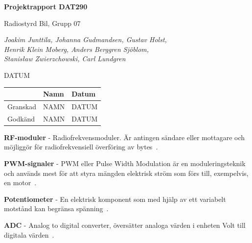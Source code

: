 \documentclass[a4paper]{article}
\begin{document}
\begin{titlepage}
\centering
{\bfseries\huge Projektrapport DAT290}

\vspace{10mm}

{\Large Radiostyrd Bil, Grupp 07}

\vspace{20mm}

{\Large \itshape{Joakim Junttila, Johanna Gudmandsen, Gustav Holst,\\Henrik Klein Moberg, Anders Berggren Sjöblom, \\[1mm] Stanisław Zwierzchowski, Carl Lundgren}}

\vspace{10mm}

{DATUM}


\normalsize{
\begin{table}[b]
\centering
\begin{tabular}{|l|l|l|}  \hline
         & \bf Namn & \bf Datum   \\ \hline \hline
Granskad & NAMN     & DATUM        \\ \hline
Godkänd  & NAMN     & DATUM         \\ \hline
\end{tabular} 
\end{table}}
\end{titlepage}

\tableofcontents

\newpage
{}

\vspace{5mm} \noindent
{\bf RF-moduler} - Radiofrekvensmoduler. Är antingen sändare eller mottagare och möjliggör för radiofrekvensiell överföring av bytes~\cite{RFModule}.

\vspace{5mm} \noindent
{\bf PWM-signaler} - PWM eller Pulse Width Modulation är en moduleringsteknik och används mest för att styra mängden elektrisk ström som förs till, exempelvis, en motor~\cite{PWM}.

\vspace{5mm} \noindent
{\bf Potentiometer} - En elektrisk komponent som med hjälp av ett variabelt motstånd kan begränsa spänning~\cite{Potentiometer}.

\vspace{5mm} \noindent
{\bf ADC} - Analog to digital converter, översätter analoga värden i enheten Volt till digitala värden~\cite{ADC}.
\end{document}
